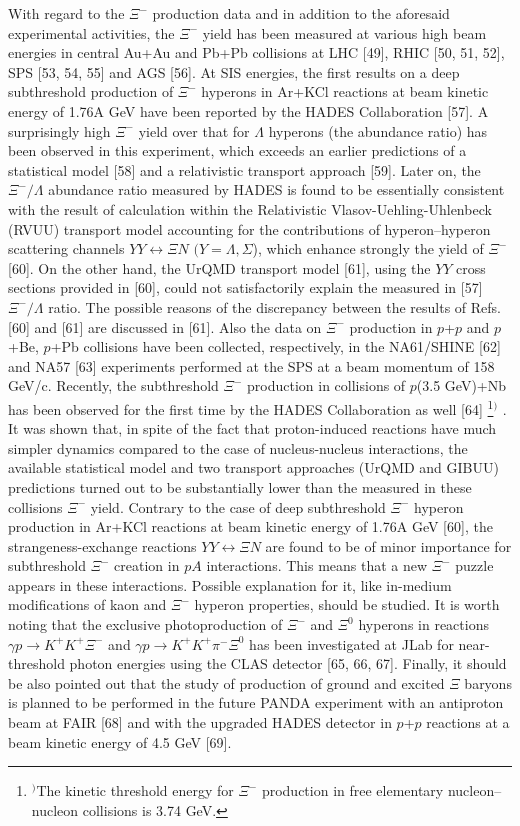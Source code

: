 \documentclass[12pt]{article}
\begin{document}
 With regard to the $\Xi^-$ production data and in addition to the aforesaid experimental activities,
the $\Xi^-$ yield has been measured at various high beam energies in central Au+Au and Pb+Pb collisions
at LHC [49], RHIC [50, 51, 52], SPS [53, 54, 55] and AGS [56]. At SIS energies, the first results on a deep
subthreshold production of $\Xi^-$ hyperons in Ar+KCl reactions at beam kinetic energy of 1.76A GeV have been
reported by the HADES Collaboration [57]. A surprisingly high $\Xi^-$ yield over that for $\Lambda$ hyperons
(the abundance ratio) has been observed in this experiment, which exceeds an earlier predictions of a
statistical model [58] and a relativistic transport approach [59]. Later on, the $\Xi^-/\Lambda$ abundance
ratio measured by HADES is found to be essentially consistent with the result of calculation within the
Relativistic Vlasov-Uehling-Uhlenbeck (RVUU) transport model accounting for the contributions of
hyperon--hyperon scattering channels $YY \leftrightarrow {\Xi}N$ $(Y=\Lambda, \Sigma$),
which enhance strongly the yield of $\Xi^-$ [60]. On the other hand, the UrQMD transport model [61],
using the $YY$ cross sections provided in [60], could not satisfactorily explain the measured in [57]
$\Xi^-/\Lambda$ ratio. The possible reasons of the discrepancy between the results of Refs. [60] and [61]
are discussed in [61]. Also the data on $\Xi^-$ production in $p$+$p$ and $p$+Be, $p$+Pb collisions have
been collected, respectively, in the NA61/SHINE [62] and NA57 [63] experiments performed
at the SPS at a beam momentum of 158 GeV/c. Recently, the subthreshold $\Xi^-$ production in collisions
of $p$(3.5 GeV)+Nb has been observed for the first time by the HADES Collaboration as well [64]
\footnote{$^)$The kinetic threshold energy for $\Xi^-$ production in free elementary nucleon--nucleon
collisions is 3.74 GeV.}$^)$
.
It was shown that, in spite of the fact that proton-induced reactions have much simpler dynamics compared
to the case of nucleus-nucleus interactions,
the available statistical model and two transport approaches (UrQMD and GIBUU)
predictions turned out to be substantially lower than the measured in these collisions $\Xi^-$ yield.
Contrary to the case of deep subthreshold $\Xi^-$ hyperon production in Ar+KCl reactions
at beam kinetic energy of 1.76A GeV [60], the strangeness-exchange reactions $YY \leftrightarrow {\Xi}N$
are found to be of minor importance for subthreshold $\Xi^-$ creation in $pA$ interactions. This means that
a new $\Xi^-$ puzzle appears in these interactions. Possible explanation for it, like in-medium modifications
of kaon and $\Xi^-$ hyperon properties, should be studied. It is worth noting that the
exclusive photoproduction of $\Xi^-$ and $\Xi^0$ hyperons in reactions ${\gamma}p \to K^+{K^+}{\Xi^-}$ and
${\gamma}p \to K^+{K^+}{\pi^-}{\Xi^0}$ has been investigated at JLab for near-threshold photon energies
using the CLAS detector [65, 66, 67]. Finally, it should be also pointed out that the study of production of
ground and excited $\Xi$ baryons is planned to be performed in the future PANDA experiment with an antiproton
beam at FAIR [68] and with the upgraded HADES detector in $p$+$p$ reactions at a beam kinetic energy
of 4.5 GeV [69].
\end{document}
